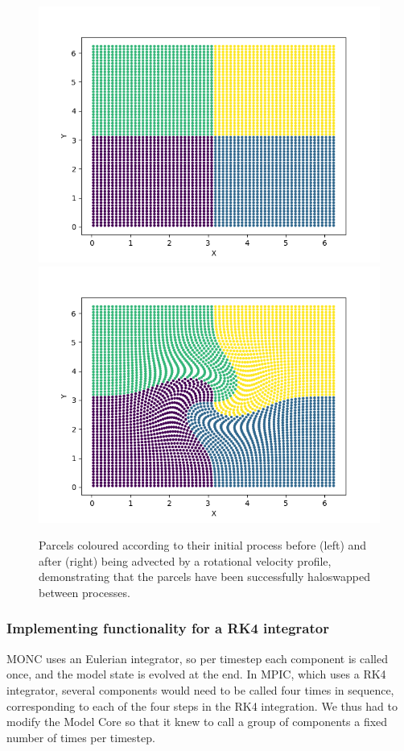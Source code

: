 \documentclass{article}
\begin{document}
\begin{figure}
  \begin{center}
    \includegraphics[scale=0.45]{pmpic_images/vel0.png}
    \includegraphics[scale=0.45]{pmpic_images/vel1.png}
  \end{center}
  \caption{Parcels coloured according to their initial process before (left) and after (right) being advected by a rotational velocity profile, demonstrating that the parcels have been successfully haloswapped between processes. \label{parcel_haloswap}}
\end{figure}

\subsubsection{Implementing functionality for a RK4 integrator}
MONC uses an Eulerian integrator, so per timestep each component is called once, and the model state is evolved at the end. In MPIC, which uses a RK4 integrator, several components would need to be called four times in sequence, corresponding to each of the four steps in the RK4 integration. We thus had to modify the Model Core so that it knew to call a group of components a fixed number of times per timestep.
\end{document}
